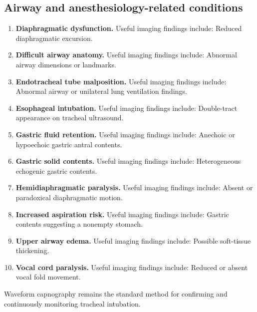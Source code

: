 \subsection{Airway and anesthesiology-related conditions}
\begin{enumerate}[leftmargin=*,itemsep=0.45em,topsep=0.4em]
\item \textbf{Diaphragmatic dysfunction.} Useful imaging findings include: Reduced diaphragmatic excursion.
\item \textbf{Difficult airway anatomy.} Useful imaging findings include: Abnormal airway dimensions or landmarks.
\item \textbf{Endotracheal tube malposition.} Useful imaging findings include: Abnormal airway or unilateral lung ventilation findings.
\item \textbf{Esophageal intubation.} Useful imaging findings include: Double-tract appearance on tracheal ultrasound.
\item \textbf{Gastric fluid retention.} Useful imaging findings include: Anechoic or hypoechoic gastric antral contents.
\item \textbf{Gastric solid contents.} Useful imaging findings include: Heterogeneous echogenic gastric contents.
\item \textbf{Hemidiaphragmatic paralysis.} Useful imaging findings include: Absent or paradoxical diaphragmatic motion.
\item \textbf{Increased aspiration risk.} Useful imaging findings include: Gastric contents suggesting a nonempty stomach.
\item \textbf{Upper airway edema.} Useful imaging findings include: Possible soft-tissue thickening.
\item \textbf{Vocal cord paralysis.} Useful imaging findings include: Reduced or absent vocal fold movement.
\end{enumerate}
Waveform capnography remains the standard method for confirming and continuously monitoring tracheal intubation.

